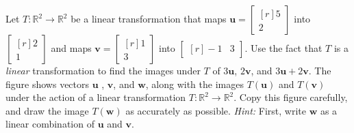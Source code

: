 \documentclass[11pt,answers]{exam} %
\renewcommand{\vec}[1]{\mathbf{#1}}
\newcommand{\mat}[1]{\begin{bmatrix*}[r] #1 \end{bmatrix*}}
\begin{document}
\begin{questions}
    \question Let $T : \mathbb{R}^2 \rightarrow \mathbb{R}^2$ be a linear transformation that maps $\vec{u} = \mat{5 \\ 2}$ into $\mat{2 \\ 1}$ and maps $\vec{v} = \mat{1 \\ 3}$ into $\mat{-1 & 3}$. Use the fact that $T$ is a \emph{linear} transformation to find the images under $T$ of $3\vec{u}$, $2\vec{v}$, and $3\vec{u}+2\vec{v}$.
    \question The figure shows vectors $\vec{u}$ , $\vec{v}$, and $\vec{w}$, along with the images $T(\vec{u})$ and $T(\vec{v})$ under the action of a linear transformation $T:\mathbb{R}^2 \rightarrow \mathbb{R}^2$. Copy this figure carefully, and draw the image $T(\vec{w})$ as accurately as possible. \emph{Hint:} First, write $\vec{w}$ as a linear combination of $\vec{u}$ and $\vec{v}$.


\end{questions}
\end{document}
